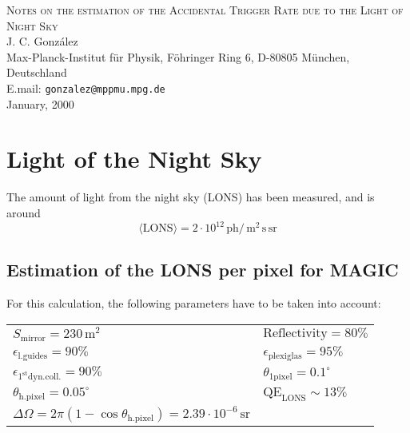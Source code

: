 \documentclass{article}
\def\Cherenkov{Cherenkov\xspace}
\def\ATR{\ensuremath{\mathrm{ATR}}\xspace}
\renewcommand{\u}[1]{\ensuremath{\,\mathrm{#1}}}  %
\begin{document}
\begin{center}
  {\large \scshape Notes on the estimation of the Accidental Trigger
        Rate due to the Light of Night Sky\\}
  J. C. Gonz\'alez\\
  {\small Max-Planck-Institut f\"ur Physik, 
  F\"ohringer Ring 6, D-80805 M\"unchen, Deutschland\\
  E.mail: \texttt{gonzalez@mppmu.mpg.de}\\}
  January, 2000
\end{center}
\vskip 1cm



\begin{abstract}
The Artificial Trigger Rate (\ATR) due to the Light of Night Sky
(LONS) must be known in order to better understand the working
conditions of our \Cherenkov telescope. In this small note I try to
estimate such \ATR for different trigger conditions.
\end{abstract}

\section*{Light of the Night Sky}

The amount of light from the night sky (LONS) has been measured, and
is around 
\begin{equation*}
\langle\mathrm{LONS}\rangle = 2\cdot 10^{12} \u{ph}/\u{m}^2\u{s}\u{sr}
\end{equation*}

\subsection*{Estimation of the LONS per pixel for MAGIC}

For this calculation, the following parameters have to be taken into
account:

\begin{center}
\begin{tabular}{ll}
$S_{\text{mirror}} = 230 \u{m}^2 $ &
$\text{Reflectivity} = 80\% $ \\
$\epsilon_{\text{l.guides}} = 90\% $ &
$\epsilon_{\text{plexiglas}} = 95\% $ \\
$\epsilon_{1^{\mathrm{st}}\text{dyn.coll.}} = 90\%$ &
$\theta_{\text{1pixel}} = 0.1^\circ$ \\
$\theta_{\text{h.pixel}} = 0.05^\circ$ &
$\mathrm{QE}_{\mathrm{LONS}} \sim 13\% $ \\
$\Delta\Omega = 2\pi(1-\cos\theta_{\text{h.pixel}}) 
= 2.39\cdot 10^{-6} \u{sr}$ \\
\end{tabular}
\end{center}
\end{document}
